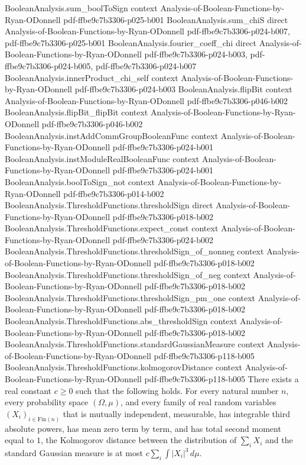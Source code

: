 \begin{theorem}
\proofstep
  {BooleanAnalysis.sum_boolToSign}
  {context}
  {Analysis-of-Boolean-Functions-by-Ryan-ODonnell}
  {pdf-ffbe9c7b3306-p025-b001}
\proofstep
  {BooleanAnalysis.sum_chiS}
  {direct}
  {Analysis-of-Boolean-Functions-by-Ryan-ODonnell}
  {pdf-ffbe9c7b3306-p024-b007,
    pdf-ffbe9c7b3306-p025-b001}
\proofstep
  {BooleanAnalysis.fourier_coeff_chi}
  {direct}
  {Analysis-of-Boolean-Functions-by-Ryan-ODonnell}
  {pdf-ffbe9c7b3306-p024-b003,
    pdf-ffbe9c7b3306-p024-b005,
    pdf-ffbe9c7b3306-p024-b007}
\proofstep
  {BooleanAnalysis.innerProduct_chi_self}
  {context}
  {Analysis-of-Boolean-Functions-by-Ryan-ODonnell}
  {pdf-ffbe9c7b3306-p024-b003}
\proofstep
  {BooleanAnalysis.flipBit}
  {context}
  {Analysis-of-Boolean-Functions-by-Ryan-ODonnell}
  {pdf-ffbe9c7b3306-p046-b002}
\proofstep
  {BooleanAnalysis.flipBit_flipBit}
  {context}
  {Analysis-of-Boolean-Functions-by-Ryan-ODonnell}
  {pdf-ffbe9c7b3306-p046-b002}
\proofstep
  {BooleanAnalysis.instAddCommGroupBooleanFunc}
  {context}
  {Analysis-of-Boolean-Functions-by-Ryan-ODonnell}
  {pdf-ffbe9c7b3306-p024-b001}
\proofstep
  {BooleanAnalysis.instModuleRealBooleanFunc}
  {context}
  {Analysis-of-Boolean-Functions-by-Ryan-ODonnell}
  {pdf-ffbe9c7b3306-p024-b001}
\proofstep
  {BooleanAnalysis.boolToSign_not}
  {context}
  {Analysis-of-Boolean-Functions-by-Ryan-ODonnell}
  {pdf-ffbe9c7b3306-p014-b002}
\proofstep
  {BooleanAnalysis.ThresholdFunctions.thresholdSign}
  {direct}
  {Analysis-of-Boolean-Functions-by-Ryan-ODonnell}
  {pdf-ffbe9c7b3306-p018-b002}
\proofstep
  {BooleanAnalysis.ThresholdFunctions.expect_const}
  {context}
  {Analysis-of-Boolean-Functions-by-Ryan-ODonnell}
  {pdf-ffbe9c7b3306-p024-b002}
\proofstep
  {BooleanAnalysis.ThresholdFunctions.thresholdSign_of_nonneg}
  {context}
  {Analysis-of-Boolean-Functions-by-Ryan-ODonnell}
  {pdf-ffbe9c7b3306-p018-b002}
\proofstep
  {BooleanAnalysis.ThresholdFunctions.thresholdSign_of_neg}
  {context}
  {Analysis-of-Boolean-Functions-by-Ryan-ODonnell}
  {pdf-ffbe9c7b3306-p018-b002}
\proofstep
  {BooleanAnalysis.ThresholdFunctions.thresholdSign_pm_one}
  {context}
  {Analysis-of-Boolean-Functions-by-Ryan-ODonnell}
  {pdf-ffbe9c7b3306-p018-b002}
\proofstep
  {BooleanAnalysis.ThresholdFunctions.abs_thresholdSign}
  {context}
  {Analysis-of-Boolean-Functions-by-Ryan-ODonnell}
  {pdf-ffbe9c7b3306-p018-b002}
\proofstep
  {BooleanAnalysis.ThresholdFunctions.standardGaussianMeasure}
  {context}
  {Analysis-of-Boolean-Functions-by-Ryan-ODonnell}
  {pdf-ffbe9c7b3306-p118-b005}
\proofstep
  {BooleanAnalysis.ThresholdFunctions.kolmogorovDistance}
  {context}
  {Analysis-of-Boolean-Functions-by-Ryan-ODonnell}
  {pdf-ffbe9c7b3306-p118-b005}
There exists a real constant $c\ge0$ such that the following holds. For every natural
number $n$, every probability space $(\Omega,\mu)$, and every family of real random
variables $(X_i)_{i\in\mathrm{Fin}(n)}$ that is mutually independent, measurable, has
integrable third absolute powers, has mean zero term by term, and has total second
moment equal to $1$, the Kolmogorov distance between the distribution of $\sum_i X_i$
and the standard Gaussian measure is at most $c\sum_i\int |X_i|^3\,d\mu$.
\end{theorem}


